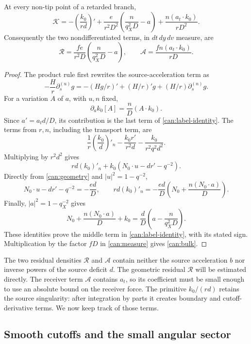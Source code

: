 \begin{lemma}\label{can:identity}
At every non-tip point of a retarded branch,
\begin{equation}\label{can:label-identity}
 \mathcal K
 =-\left(\frac{k_0}{rd}\right)'
  +\frac{e}{r^2D^2}\left(\frac{n}{q_X^2D}-a\right)
  +\frac{n(a_t\cdot k_0)}{rD^2}.
\end{equation}
Consequently the two nondifferentiated terms, in $dt\,dy\,dv$ measure,
are
\begin{equation}\label{can:bulk}
 \mathcal R=\frac{fe}{r^2D}\left(\frac{n}{q_X^2D}-a\right),
 \qquad
 \mathcal A=\frac{fn(a_t\cdot k_0)}{rD}.
\end{equation}
\end{lemma}

\begin{proof}
The product rule first rewrites the source-acceleration term as
\[
 -\frac Hr\partial_s^{(u)}g
 =-(Hg/r)'+(H/r)'g+(H/r)\partial_s^{(n)}g.
\]
For a variation $A$ of $a$, with $u,n$ fixed,
\[
 \partial_a k_0[A]=\frac nD(A\cdot k_0).
\]
Since $a'=a_t d/D$, its contribution is the last term of
\eqref{can:label-identity}.
The terms from $r,n$, including the transport term, are
\[
 \frac1r\left(\frac{k_0}{d}\right)'_n
       -\frac{k_0r'}{r^2d}-\frac{k_0}{r^2q^2d^2}.
\]
Multiplying by $r^2d^2$ gives
\[
 rd(k_0)'_n+k_0(N_0\cdot u-dr'-q^{-2}).
\]
Directly from \eqref{can:geometry} and $|u|^2=1-q^{-2}$,
\[
 N_0\cdot u-dr'-q^{-2}=-\frac{ed}{D},
 \qquad
 rd(k_0)'_n=-\frac{ed}{D}
            \left(N_0+\frac{n(N_0\cdot a)}D\right).
\]
Finally, $|a|^2=1-q_X^{-2}$ gives
\[
 N_0+\frac{n(N_0\cdot a)}D+k_0
   =\frac dD\left(a-\frac{n}{q_X^2D}\right).
\]
These identities prove the middle term in
\eqref{can:label-identity}, with its stated sign. Multiplication by the
factor $fD$ in \eqref{can:measure} gives \eqref{can:bulk}.
\end{proof}

The two residual densities $\mathcal R$ and $\mathcal A$ contain neither
the source acceleration $b$ nor inverse powers of the source deficit $d$.
The geometric residual $\mathcal R$ will be estimated directly. The
receiver term $\mathcal A$ contains $a_t$, so its coefficient must be
small enough to use an absolute bound on the receiver force. The
primitive $k_0/(rd)$ retains the source singularity: after integration
by parts it creates boundary and cutoff-derivative terms. We now keep
track of those terms.

\subsection{Smooth cutoffs and the small angular sector}

